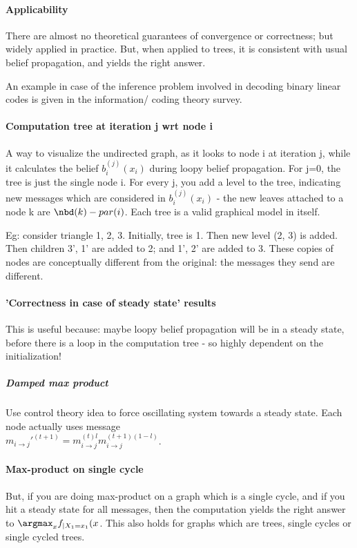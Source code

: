 \documentclass[oneside, article]{memoir}
\begin{document}
\paragraph*{Applicability}
There are almost no theoretical guarantees of convergence or correctness; but widely applied in practice. But, when applied to trees, it is consistent with usual belief propagation, and yields the right answer.

An example in case of the inference problem involved in decoding binary linear codes is given in the information/ coding theory survey.

\paragraph*{Computation tree at iteration j wrt node i}
A way to visualize the undirected graph, as it looks to node i at iteration j, while it calculates the belief $b_i^{(j)}(x_i)$ during loopy belief propagation. For j=0, the tree is just the single node i. For every j, you add a level to the tree, indicating new messages which are considered in $b_i^{(j)}(x_i)$ - the new leaves attached to a node k are $\nbd(k) - par(i)$. Each tree is a valid graphical model in itself.

Eg: consider triangle 1, 2, 3. Initially, tree is 1. Then new level (2, 3) is added. Then children 3', 1' are added to 2; and 1', 2' are added to 3. These copies of nodes are conceptually different from the original: the messages they send are different.

\paragraph*{'Correctness in case of steady state' results}
This is useful because: maybe loopy belief propagation will be in a steady state, before there is a loop in the computation tree - so highly dependent on the initialization!

\subparagraph*{Damped max product}
Use control theory idea to force oscillating system towards a steady state. Each node actually uses message \\
$m_{i \to j}'^{(t+1)} = m_{i \to j}^{(t)l}m_{i \to j}^{(t+1)(1-l)}$.

\paragraph*{Max-product on single cycle}
But, if you are doing max-product on a graph which is a single cycle, and if you hit a steady state for all messages, then the computation yields the right answer to $\argmax_x f_{|X_1 = x_1}(x$. This also holds for graphs which are trees, single cycles or single cycled trees.
\end{document}
